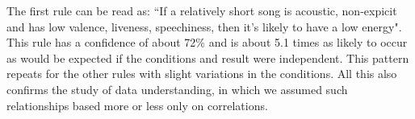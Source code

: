 The first rule can be read as: “If a relatively short song is acoustic, non-expicit and has low valence, liveness, speechiness, then it’s likely to have a low energy". This rule has a confidence of about 72\% and is about 5.1 times as likely to occur as would be expected if the conditions and result were independent. This pattern repeats for the other rules with slight variations in the conditions. All this also confirms the study of data understanding, in which we assumed such relationships based more or less only on correlations.
